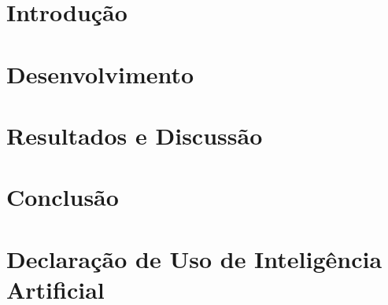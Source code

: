 \documentclass[english,brazil]{packages/icmc}
\begin{document}
\textual

\chapter{Introdução}
\label{chapter:introducao}


\chapter{Desenvolvimento}
\label{chapter:desenvolvimento}


\chapter{Resultados e Discussão}
\label{chapter:resultados-testes}


\chapter{Conclusão}
\label{chapter:conclusao}


\chapter*{Declaração de Uso de Inteligência Artificial}
{}



% 

\postextual



\end{document}
